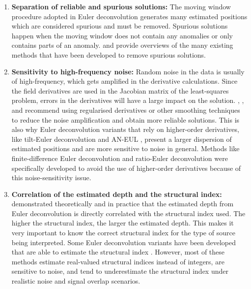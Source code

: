 \begin{enumerate}

\item \textbf{Separation of reliable and spurious solutions:}
The moving window procedure adopted in Euler deconvolution generates many estimated positions which are considered spurious and must be removed.
Spurious solutions happen when the moving window does not contain any anomalies or only contains parts of an anomaly.
\citet{FitzGerald2004} and \citet{Melo2020} provide overviews of the many existing methods that have been developed to remove spurious solutions.

\item \textbf{Sensitivity to high-frequency noise:} Random noise in the data is usually of high-frequency, which gets amplified in the derivative calculations. Since the field derivatives are used in the Jacobian matrix of the least-squares problem, errors in the derivatives will have a large impact on the solution.
\citet{Pasteka2009}, \citet{Saleh2012}, and \citet{Florio2014} recommend using regularised derivatives or other smoothing techniques to reduce the noise amplification and obtain more reliable solutions.
This is also why Euler deconvolution variants that rely on higher-order derivatives, like tilt-Euler deconvolution \citep{Salem2007,Huang2019} and AN-EUL \citep{Salem2003}, present a larger dispersion of estimated positions and are more sensitive to noise in general.
Methods like finite-difference Euler deconvolution \citep{Gerovska2005} and ratio-Euler deconvolution \citep{Huang2022} were specifically developed to avoid the use of higher-order derivatives because of this noise-sensitivity issue.

\item \textbf{Correlation of the estimated depth and the structural index:}
\citet{Silva2001} demonstrated theoretically and in practice that the estimated depth from Euler deconvolution is directly correlated with the structural index used.
The higher the structural index, the larger the estimated depth.
This makes it very important to know the correct structural index for the type of source being interpreted.
Some Euler deconvolution variants have been developed that are able to estimate the structural index \citep[e.g.,][]{Melo2013,Melo2018,Salem2003,Salem2007,Gerovska2005,Silva2003,Florio2013,Florio2014}.
However, most of these methods estimate real-valued structural indices instead of integers, are sensitive to noise, and tend to underestimate the structural index under realistic noise and signal overlap scenarios.

\end{enumerate}

